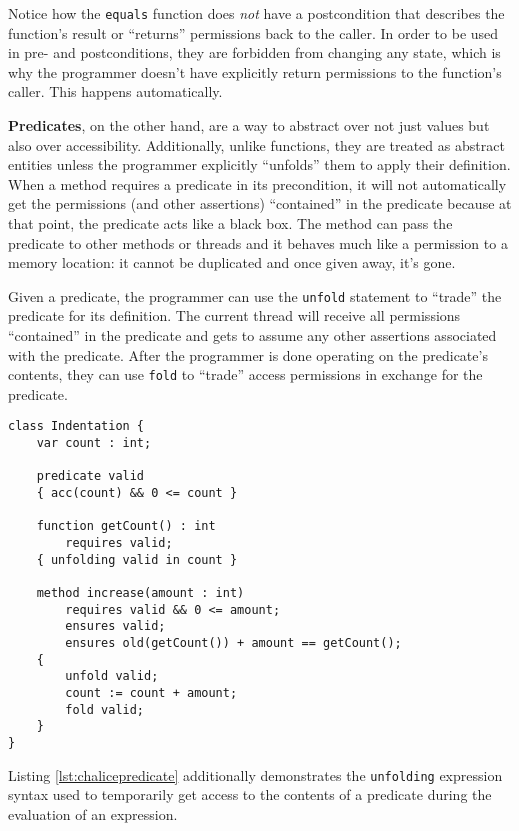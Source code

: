 Notice how the \lstinline!equals! function does \emph{not} have a postcondition that describes the function's result or ``returns'' permissions back to the caller.  
In order to be used in pre- and postconditions, they are forbidden from changing any state, which is why the programmer doesn't have explicitly return permissions to the function's caller. 
This happens automatically.

\textbf{Predicates}, on the other hand, are a way to abstract over not just values but also over accessibility. 
Additionally, unlike functions, they are treated as abstract entities unless the programmer explicitly ``unfolds'' them to apply their definition.
When a method requires a predicate in its precondition, it will not automatically get the permissions (and other assertions) ``contained'' in the predicate because at that point, the predicate acts like a black box.
The method can pass the predicate to other methods or threads and it behaves much like a permission to a memory location: it cannot be duplicated and once given away, it's gone.

Given a predicate, the programmer can use the \lstinline[language=Chalice]!unfold! statement to ``trade'' the predicate for its definition. 
The current thread will receive all permissions ``contained'' in the predicate and gets to assume any other assertions associated with the predicate.
After the programmer is done operating on the predicate's contents, they can use \lstinline[language=Chalice]!fold! to ``trade'' access permissions in exchange for the predicate.

\begin{lstlisting}[language=Chalice,float,caption={Using the predicate \lstinline!valid! to hide the representation of \lstinline!Indentation!},label={lst:chalicepredicate}]
class Indentation {
    var count : int;

    predicate valid
    { acc(count) && 0 <= count }

    function getCount() : int
        requires valid;
    { unfolding valid in count }

    method increase(amount : int)
        requires valid && 0 <= amount;
        ensures valid;
        ensures old(getCount()) + amount == getCount();
    {
        unfold valid;
        count := count + amount;
        fold valid;
    }
}
\end{lstlisting}

Listing \ref{lst:chalicepredicate} additionally demonstrates the \lstinline[language=Chalice]!unfolding! expression syntax used to temporarily get access to the contents of a predicate during the evaluation of an expression.

